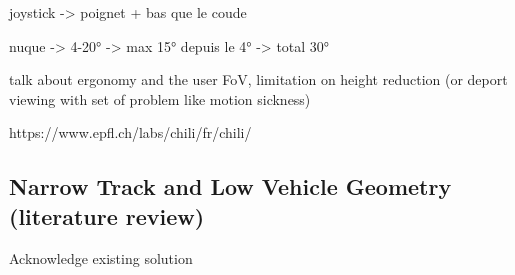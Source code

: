 joystick -> poignet + bas que le coude

nuque -> 4-20°  -> max 15° depuis le 4° ->  total 30°

talk about ergonomy and the user FoV, limitation on height reduction (or deport viewing with set of problem like motion sickness)

https://www.epfl.ch/labs/chili/fr/chili/

\subsection{Narrow Track and Low Vehicle Geometry (literature review)}
Acknowledge existing solution